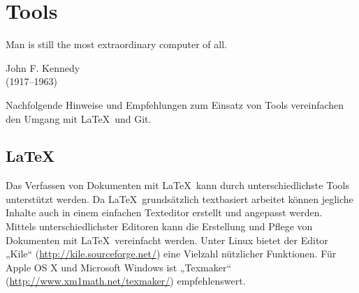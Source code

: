 \chapter{Tools}

\epigraph{\glqq Man is still the most extraordinary computer of all.\grqq\bigskip}%
{{John F. Kennedy}\\ (1917--1963)}

\noindent
Nachfolgende Hinweise und Empfehlungen zum Einsatz von Tools vereinfachen den Umgang mit \LaTeX\ und Git.
\indent

\section{\LaTeX}

Das Verfassen von Dokumenten mit \LaTeX\ kann durch unterschiedlichste Tools unterstützt werden. Da \LaTeX\ grundsätzlich textbasiert arbeitet können jegliche Inhalte auch in einem einfachen Texteditor erstellt und angepasst werden.\\

Mittels unterschiedlichster Editoren kann die Erstellung und Pflege von Dokumenten mit \LaTeX\ vereinfacht werden. Unter Linux bietet der Editor „Kile“ (\url{http://kile.sourceforge.net/}) eine Vielzahl nützlicher Funktionen. Für Apple OS X und Microsoft Windows ist „Texmaker“ (\url{http://www.xm1math.net/texmaker/}) empfehlenswert.